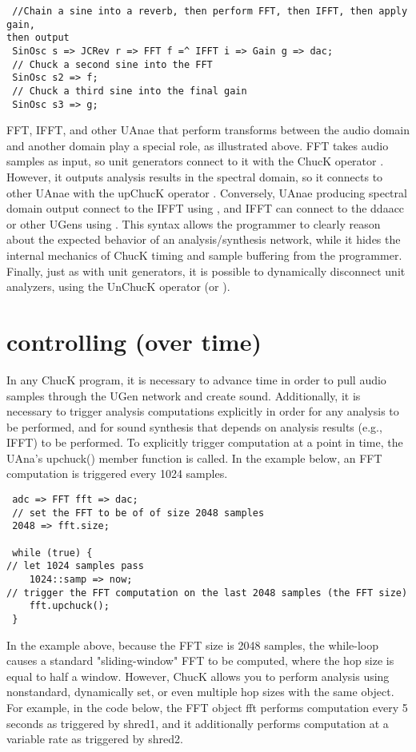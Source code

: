 \begin{verbatim}
 //Chain a sine into a reverb, then perform FFT, then IFFT, then apply gain,
then output
 SinOsc s => JCRev r => FFT f =^ IFFT i => Gain g => dac;
 // Chuck a second sine into the FFT
 SinOsc s2 => f;
 // Chuck a third sine into the final gain
 SinOsc s3 => g;
\end{verbatim}

FFT, IFFT, and other UAnae that perform transforms between the audio domain and
another domain play a special role, as illustrated above. FFT takes audio
samples as input, so unit generators connect to it with the ChucK operator \chuckop.
However, it outputs analysis results in the spectral domain, so it connects to
other UAnae with the upChucK operator \upchuckop. Conversely, UAnae producing spectral
domain output connect to the IFFT using \chuckop, and IFFT can connect to the ddaacc or
other UGens using \chuckop. This syntax allows the programmer to clearly reason about
the expected behavior of an analysis/synthesis network, while it hides the
internal mechanics of ChucK timing and sample buffering from the programmer.
Finally, just as with unit generators, it is possible to dynamically disconnect
unit analyzers, using the UnChucK operator (\unchuckopp or \unchuckop).

\section{controlling (over time)}

In any ChucK program, it is necessary to advance time in order to pull audio
samples through the UGen network and create sound. Additionally, it is
necessary to trigger analysis computations explicitly in order for any analysis
to be performed, and for sound synthesis that depends on analysis results
(e.g., IFFT) to be performed. To explicitly trigger computation at a point in
time, the UAna's upchuck() member function is called. In the example below, an
FFT computation is triggered every 1024 samples.

\begin{verbatim}
 adc => FFT fft => dac;
 // set the FFT to be of of size 2048 samples
 2048 => fft.size;

 while (true) {
// let 1024 samples pass
 	1024::samp => now;
// trigger the FFT computation on the last 2048 samples (the FFT size)
 	fft.upchuck();
 }
\end{verbatim}

In the example above, because the FFT size is 2048 samples, the while-loop
causes a standard "sliding-window" FFT to be computed, where the hop size is
equal to half a window. However, ChucK allows you to perform analysis using
nonstandard, dynamically set, or even multiple hop sizes with the same object.
For example, in the code below, the FFT object fft performs computation every 5
seconds as triggered by shred1, and it additionally performs computation at a
variable rate as triggered by shred2.

